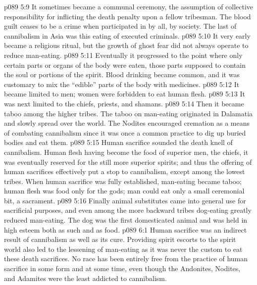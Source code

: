 \pc \vs p089 5:9 \bibnobreakspace It sometimes became a communal ceremony, the assumption of collective responsibility for inflicting the death penalty upon a fellow tribesman. The blood guilt ceases to be a crime when participated in by all, by society. The last of cannibalism in Asia was this eating of executed criminals.
\pc \vs p089 5:10 \bibnobreakspace It very early became a religious ritual, but the growth of ghost fear did not always operate to reduce man\hyp{}eating.
\pc \vs p089 5:11 \bibnobreakspace Eventually it progressed to the point where only certain parts or organs of the body were eaten, those parts supposed to contain the soul or portions of the spirit. Blood drinking became common, and it was customary to mix the “edible” parts of the body with medicines.
\pc \vs p089 5:12 \bibnobreakspace It became limited to men; women were forbidden to eat human flesh.
\pc \vs p089 5:13 \bibnobreakspace It was next limited to the chiefs, priests, and shamans.
\pc \vs p089 5:14 \bibnobreakspace Then it became taboo among the higher tribes. The taboo on man\hyp{}eating originated in Dalamatia and slowly spread over the world. The Nodites encouraged cremation as a means of combating cannibalism since it was once a common practice to dig up buried bodies and eat them.
\pc \vs p089 5:15 \bibnobreakspace Human sacrifice sounded the death knell of cannibalism. Human flesh having become the food of superior men, the chiefs, it was eventually reserved for the still more superior spirits; and thus the offering of human sacrifices effectively put a stop to cannibalism, except among the lowest tribes. When human sacrifice was fully established, man\hyp{}eating became taboo; human flesh was food only for the gods; man could eat only a small ceremonial bit, a sacrament.
\pc \vs p089 5:16 Finally animal substitutes came into general use for sacrificial purposes, and even among the more backward tribes dog\hyp{}eating greatly reduced man\hyp{}eating. The dog was the first domesticated animal and was held in high esteem both as such and as food.\plusone
{}
\vs p089 6:1 Human sacrifice was an indirect result of cannibalism as well as its cure. Providing spirit escorts to the spirit world also led to the lessening of man\hyp{}eating as it was never the custom to eat these death sacrifices. No race has been entirely free from the practice of human sacrifice in some form and at some time, even though the Andonites, Nodites, and Adamites were the least addicted to cannibalism.
